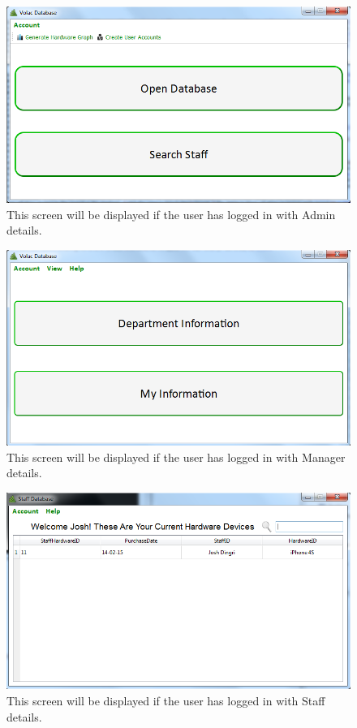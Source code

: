 \begin{figure}[H]
    \includegraphics[width=\textwidth]{./Testing/Images/AdminInterface.png}
    \caption{This screen will be displayed if the user has logged in with Admin details.} \label{fig:AdminInterfaceLogin}
\end{figure}

\begin{figure}[H]
    \includegraphics[width=\textwidth]{./Testing/Images/ManagerLogin.png}
    \caption{This screen will be displayed if the user has logged in with Manager details.} \label{fig:ManagerInterfaceLogin}
\end{figure}

\begin{figure}[H]
    \includegraphics[width=\textwidth]{./Testing/Images/StaffLogin.png}
    \caption{This screen will be displayed if the user has logged in with Staff details.} \label{fig:StaffInterfaceLogin}
\end{figure}

